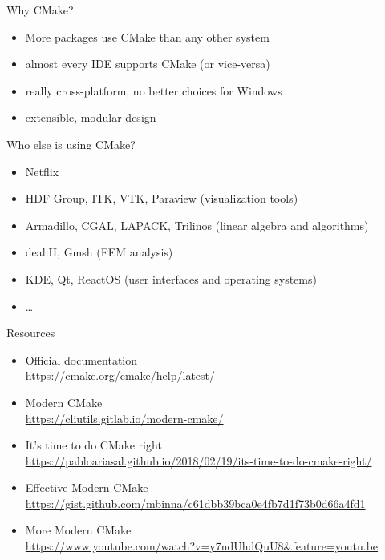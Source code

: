 \documentclass[aspectratio=169,11pt]{beamer}
\begin{document}
\begin{frame}{Why CMake?}
\begin{itemize}
    \item More packages use CMake than any other system
    \item almost every IDE supports CMake (or vice-versa)
    \item really cross-platform, no better choices for Windows
    \item extensible, modular design
\end{itemize}
\vfill
\pause
Who else is using CMake?
\begin{itemize}
    \item Netflix
    \item HDF Group, ITK, VTK, Paraview (visualization tools)
    \item Armadillo, CGAL, LAPACK, Trilinos (linear algebra and algorithms)
    \item deal.II, Gmsh (FEM analysis)
    \item KDE, Qt, ReactOS (user interfaces and operating systems)
    \item \dots
\end{itemize}
\end{frame}

\begin{frame}{Resources}
\begin{itemize}
    \item Official documentation\\
    \url{https://cmake.org/cmake/help/latest/}
    \vfill
    \item Modern CMake\\
    \url{https://cliutils.gitlab.io/modern-cmake/}
    \vfill
    \item{It's time to do CMake right}\\
    \url{https://pabloariasal.github.io/2018/02/19/its-time-to-do-cmake-right/}
    \vfill
    \item Effective Modern CMake\\ \url{https://gist.github.com/mbinna/c61dbb39bca0e4fb7d1f73b0d66a4fd1}
    \vfill
    \item More Modern CMake\\ \url{https://www.youtube.com/watch?v=y7ndUhdQuU8&feature=youtu.be}
\end{itemize}
\end{frame}
\end{document}
